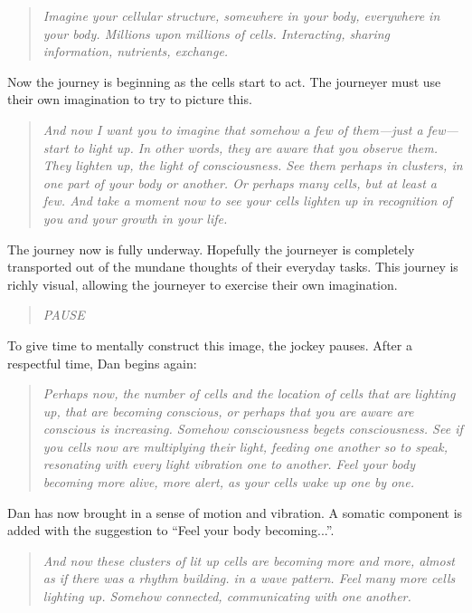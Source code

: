 \documentclass[12pt]{book}
\begin{document}
\begin{quote}{\em
Imagine your cellular structure, somewhere in your body, everywhere in your body.
Millions upon millions of cells. Interacting, sharing information, nutrients,
exchange.
}\end{quote}
Now the journey is beginning as the cells start to act. The journeyer
must use their own imagination to try to picture this.

\begin{quote}{\em
And now I want you to imagine that somehow a few of them---just a few---start to light up.
In other words, they are aware that you observe them.
They lighten up, the light of consciousness.
See them perhaps in clusters, in one part of your body or another.
Or perhaps many cells, but at least a few. And take a moment now
to see your cells lighten up in recognition of you and your growth in
your life.
}\end{quote}

The journey now is fully underway. Hopefully the journeyer is completely
transported out of the mundane thoughts of their everyday tasks. This
journey is richly visual, allowing the journeyer to exercise their
own imagination.

\begin{quote}{\em
  PAUSE
}\end{quote}

To give time to mentally construct this image, the jockey pauses.
After a respectful time, Dan begins again:

\begin{quote}{\em
Perhaps now, the number of cells and the location of cells that are lighting
up, that are becoming conscious, or perhaps that you are aware are conscious
is increasing. Somehow consciousness begets consciousness. See if you cells
now are multiplying their light, feeding one another so to speak, resonating
with every light vibration one to another. Feel your body becoming more
alive, more alert, as your cells wake up one by one.
}\end{quote}

Dan has now brought in a sense of motion and vibration. A somatic
component is added with the suggestion to ``Feel your body becoming...''.

\begin{quote}{\em
And now these clusters of lit up cells are becoming more and more, almost
as if there was a rhythm building.
in a wave pattern. Feel many more cells lighting up. Somehow connected,
communicating with one another.
}\end{quote}
\end{document}
